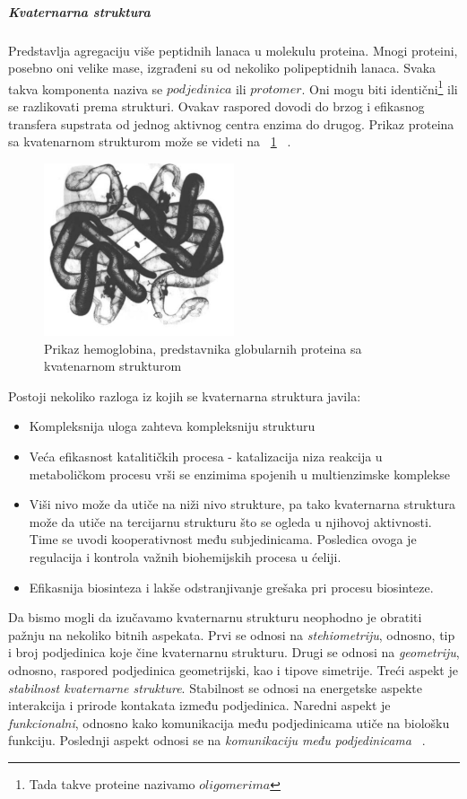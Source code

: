 \subparagraph{Kvaternarna struktura}
Predstavlja agregaciju više peptidnih lanaca u molekulu proteina. Mnogi proteini, posebno oni velike mase, izgrađeni su od nekoliko polipeptidnih lanaca. Svaka takva komponenta naziva se $podjedinica$ ili $protomer$. Oni mogu biti identični\footnote{Tada takve proteine nazivamo $oligomerima$} ili se razlikovati prema strukturi. Ovakav raspored dovodi do brzog i efikasnog transfera supstrata od jednog aktivnog centra enzima do drugog. Prikaz proteina sa kvatenarnom strukturom može se videti na ~\ref{fig:hemoglobin} ~\cite{spasic,medbio}.
\begin{figure}[h]
	\centering
    \includegraphics[width=0.5\textwidth]{Figures/BO/hemoglobin.png}
    \caption{Prikaz hemoglobina, predstavnika globularnih proteina sa kvatenarnom strukturom~\cite{Principi}}
    \label{fig:hemoglobin}
\end{figure}  
Postoji nekoliko razloga iz kojih se kvaternarna struktura javila:
\begin{itemize}
\item Kompleksnija uloga zahteva kompleksniju strukturu 
\item Veća efikasnost katalitičkih procesa - katalizacija niza reakcija u metaboličkom procesu vrši se enzimima spojenih u multienzimske komplekse
\item Viši nivo može da utiče na niži nivo strukture, pa tako kvaternarna struktura može da utiče na tercijarnu strukturu što se ogleda u njihovoj aktivnosti. Time se uvodi kooperativnost među subjedinicama. Posledica ovoga je regulacija i kontrola važnih biohemijskih procesa u ćeliji. 
\item Efikasnija biosinteza i lakše odstranjivanje grešaka pri procesu biosinteze.
\end{itemize}
 Da bismo mogli da izučavamo kvaternarnu strukturu neophodno je obratiti pažnju na nekoliko bitnih aspekata. Prvi se odnosi na \textit{stehiometriju}, odnosno, tip i broj podjedinica koje čine kvaternarnu strukturu. Drugi se odnosi na \textit{geometriju}, odnosno, raspored podjedinica geometrijski, kao i tipove simetrije. Treći aspekt je \textit{stabilnost kvaternarne strukture}. Stabilnost se odnosi na energetske aspekte interakcija i prirode kontakata između podjedinica. Naredni aspekt je \textit{funkcionalni}, odnosno kako komunikacija među podjedinicama utiče na biološku funkciju. Poslednji aspekt odnosi se na \textit{komunikaciju među podjedinicama} ~\cite{Principi}.
 
